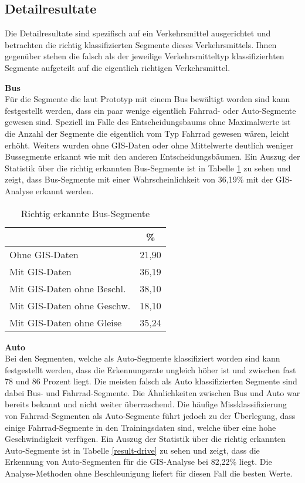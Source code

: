 \subsection{Detailresultate}
Die Detailresultate sind spezifisch auf ein Verkehrsmittel ausgerichtet und betrachten die richtig klassifizierten Segmente dieses Verkehrsmittels. Ihnen gegenüber stehen die falsch als der jeweilige Verkehrsmitteltyp klassifizierhten Segmente aufgeteilt auf die eigentlich richtigen Verkehrsmittel.

\textbf{Bus} \\
Für die Segmente die laut Prototyp mit einem Bus bewältigt worden sind kann festgestellt werden, dass ein paar wenige eigentlich Fahrrad- oder Auto-Segmente gewesen sind. Speziell im Falle des Entscheidungsbaums ohne Maximalwerte ist die Anzahl der Segmente die eigentlich vom Typ Fahrrad gewesen wären, leicht erhöht. Weiters wurden ohne GIS-Daten oder ohne Mittelwerte deutlich weniger Bussegmente erkannt wie mit den anderen Entscheidungsbäumen. Ein Auszug der Statistik über die richtig erkannten Bus-Segmente ist in Tabelle \ref{result-bus} zu sehen und zeigt, dass Bus-Segmente mit einer Wahrscheinlichkeit von 36,19\% mit der GIS-Analyse erkannt werden.

\begin{table}[h]
\centering
\begin{tabular}{|l|c|}
\hline
 & \% \\ \hline
Ohne GIS-Daten & 21,90 \\ \hline
Mit GIS-Daten & 36,19 \\ \hline
Mit GIS-Daten ohne Beschl. & 38,10 \\ \hline
Mit GIS-Daten ohne Geschw. & 18,10 \\ \hline
Mit GIS-Daten ohne Gleise & 35,24 \\ \hline
\end{tabular}
\caption{Richtig erkannte Bus-Segmente}
\label{result-bus}
\end{table}

\textbf{Auto} \\
Bei den Segmenten, welche als Auto-Segmente klassifiziert worden sind kann festgestellt werden, dass die Erkennungsrate ungleich höher ist und zwischen fast 78 und 86 Prozent liegt. Die meisten falsch als Auto klassifizierten Segmente sind dabei Bus- und Fahrrad-Segmente. Die Ähnlichkeiten zwischen Bus und Auto war bereits bekannt und nicht weiter überraschend. Die häufige Missklassifizierung von Fahrrad-Segmenten als Auto-Segmente führt jedoch zu der Überlegung, dass einige Fahrrad-Segmente in den Trainingsdaten sind, welche über eine hohe Geschwindigkeit verfügen. Ein Auszug der Statistik über die richtig erkannten Auto-Segmente ist in Tabelle \ref{result-drive} zu sehen und zeigt, dass die Erkennung von Auto-Segmenten für die GIS-Analyse bei 82,22\% liegt. Die Analyse-Methoden ohne Beschleunigung liefert für diesen Fall die besten Werte.

